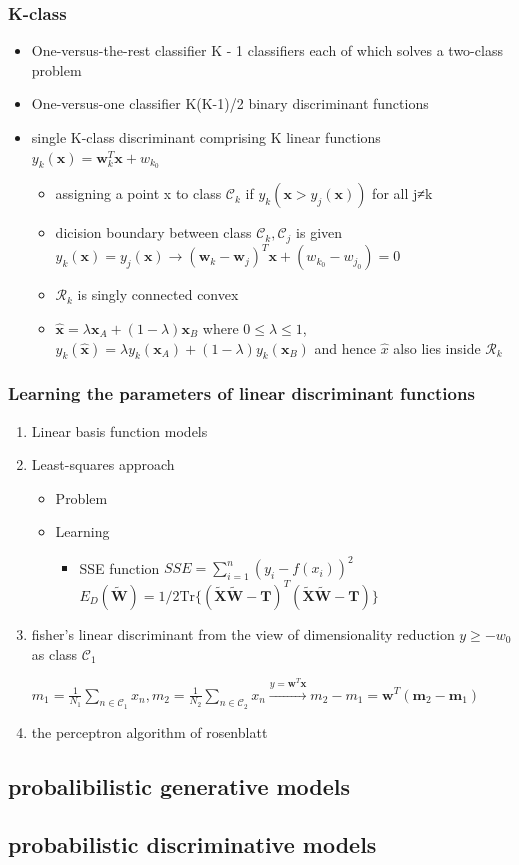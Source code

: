 \documentclass[11pt]{article}
\newcommand{\bl}[1] {\boldsymbol{#1}}
\begin{document}
\subsubsection{K-class}
\label{sec:org44ac30a}
\begin{itemize}
\item One-versus-the-rest classifier
K - 1 classifiers each of which solves a two-class problem
\item One-versus-one classifier
K(K-1)/2 binary discriminant functions
\item single K-class discriminant comprising K linear functions
\(y_k(\bl{x})=\bl{w}_k^T\bl{x}+w_{k_0}\)
\begin{itemize}
\item assigning a point x to class \(\mathcal{C}_k\) if
\(y_k(\bl{x}>y_j(\bl{x}))\) for all j≠k
\item dicision boundary between class \(\mathcal{C}_k, \mathcal{C}_j\) is given
\(y_k(\bl{x})=y_j(\bl{x})\to
        (\bl{w}_k-\bl{w}_j)^T\bl{x}+(w_{k_0}-w_{j_0})=0\)
\item \(\mathcal{R}_k\) is singly connected convex
\item \(\hat{\bl{x}}=\lambda\bl{x}_A+(1-\lambda)\bl{x}_B\) where \(0\le\lambda\le
        1\), \(y_k(\hat{\bl{x}})=\lambda y_k(\bl{x}_A)+(1-\lambda)y_k(\bl{x}_B)\)
and hence \(\hat{x}\) also lies inside \(\mathcal{R}_k\)
\end{itemize}
\end{itemize}
\subsubsection{Learning the parameters of linear discriminant functions}
\label{sec:org0a553bf}
\begin{enumerate}
\item Linear basis function models
\label{sec:orgcaddb66}
\item Least-squares approach
\label{sec:orgaea651f}
\begin{itemize}
\item Problem
\item Learning
\begin{itemize}
\item SSE function
\(SSE=\displaystyle\sum_{i=1}^n(y_i-f(x_i))^2\)
\(E_D(\widetilde{\bl{W}})=1/2\text{Tr}\{(\bl{\widetilde{X}\widetilde{W}-T})^T 
         (\bl{\widetilde{X}\widetilde{W}-T})\}\)
\end{itemize}
\end{itemize}
\item fisher's linear discriminant
\label{sec:org4dd0683}
from the view of dimensionality reduction
\(y\ge -w_0\) as class \(\mathcal{C}_1\)

\(m_1=\frac{1}{N_1}\displaystyle\sum_{n\in\mathcal{C}_1}x_n, 
     m_2=\frac{1}{N_2}\displaystyle\sum_{n\in\mathcal{C}_2}x_n
     \xrightarrow{y=\bl{w}^T\bl{x}} m_2-m_1=\bl{w}^T(\bl{m}_2-\bl{m}_1)\)
\item the perceptron algorithm of rosenblatt
\label{sec:org12c4dcf}
\end{enumerate}
\subsection{probalibilistic generative models}
\label{sec:org09229e3}
\subsection{probabilistic discriminative models}
\label{sec:orga3a9f13}
\end{document}
